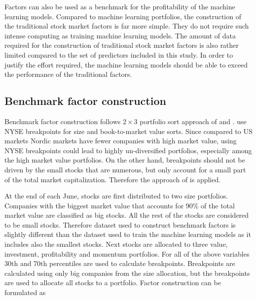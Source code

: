 \documentclass[12pt]{article}
\begin{document}
Factors can also be used as a benchmark for the profitability of the machine learning models. Compared to machine learning portfolios, the construction of the traditional stock market factors is far more simple. They do not require such intense computing as training machine learning models. The amount of data required for the construction of traditional stock market factors is also rather limited compared to the set of predictors included in this study. In order to justify the effort required, the machine learning models should be able to exceed the performance of the traditional factors.

\subsection{Benchmark factor construction}\label{BenchmarkFactorsConstruction}

Benchmark factor construction follows $2 \times 3$ portfolio sort approach of \citet{FAMA19933, FAMA20151} and \citet{Carhart1997}. \citet{FAMA19933} use NYSE breakpoints for size and book-to-market value sorts. Since compared to US markets Nordic markets have fewer companies with high market value, using NYSE breakpoints could lead to highly un-diversified portfolios, especially among the high market value portfolios. On the other hand, breakpoints should not be driven by the small stocks that are numerous, but only account for a small part of the total market capitalization. Therefore the approach of \citet{FAMA2012457} is applied.  \par

At the end of each June, stocks are first distributed to two size portfolios. Companies with the biggest market value that accounts for $90\%$ of the total market value are classified as big stocks. All the rest of the stocks are considered to be small stocks. Therefore dataset used to construct benchmark factors is slightly different than the dataset used to train the machine learning models as it includes also the smallest stocks. Next stocks are allocated to three value, investment, profitability and momentum portfolios. For all of the above variables 30th and 70th percentiles are used to calculate breakpoints. Breakpoints are calculated using only big companies from the size allocation, but the breakpoints are used to allocate all stocks to a portfolio. Factor construction can be formulated as \par
\end{document}
